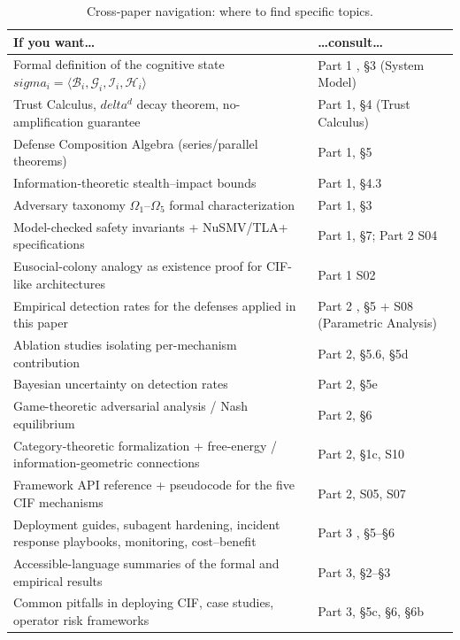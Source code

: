 \documentclass[
]{article}
\begin{document}
\begin{table}[htbp]
\centering
\caption{Cross-paper navigation: where to find specific topics.}
\label{tab:part4-navigation}
\small
\begin{tabular}{@{}p{}p{}@{}}
\toprule
If you want\ldots & \ldots consult\ldots \\
\midrule
Formal definition of the cognitive state $sigma_i = \langle \mathcal{B}_i, \mathcal{G}_i, \mathcal{I}_i, \mathcal{H}_i \rangle$ & Part 1 \cite{friedman2026cogsec1}, \S{3} (System Model) \\
Trust Calculus, $delta^d$ decay theorem, no-amplification guarantee & Part 1, \S{4} (Trust Calculus) \\
Defense Composition Algebra (series/parallel theorems) & Part 1, \S{5} \\
Information-theoretic stealth--impact bounds & Part 1, \S{4.3} \\
Adversary taxonomy $\Omega_1$--$\Omega_5$ formal characterization & Part 1, \S{3} \\
Model-checked safety invariants + NuSMV/TLA+ specifications & Part 1, \S{7}; Part 2 S04 \\
Eusocial-colony analogy as existence proof for CIF-like architectures & Part 1 S02 \\
Empirical detection rates for the defenses applied in this paper & Part 2 \cite{friedman2026cogsec2}, \S{5} + S08 (Parametric Analysis) \\
Ablation studies isolating per-mechanism contribution & Part 2, \S{5.6}, \S{5d} \\
Bayesian uncertainty on detection rates & Part 2, \S{5e} \\
Game-theoretic adversarial analysis / Nash equilibrium & Part 2, \S{6} \\
Category-theoretic formalization + free-energy / information-geometric connections & Part 2, \S{1c}, S10 \\
Framework API reference + pseudocode for the five CIF mechanisms & Part 2, S05, S07 \\
Deployment guides, subagent hardening, incident response playbooks, monitoring, cost--benefit & Part 3 \cite{friedman2026cogsec3}, \S{5}--\S{6} \\
Accessible-language summaries of the formal and empirical results & Part 3, \S{2}--\S{3} \\
Common pitfalls in deploying CIF, case studies, operator risk frameworks & Part 3, \S{5c}, \S{6}, \S{6b} \\
\bottomrule
\end{tabular}
\end{table}
\end{document}
